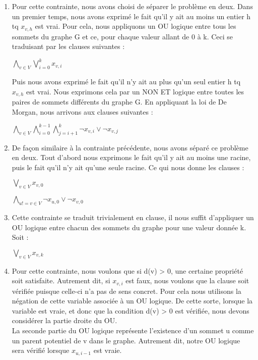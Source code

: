 \documentclass[a4paper]{article}
\begin{document}
\begin{enumerate}
\item
Pour cette contrainte, nous avons choisi de séparer le problème en deux.
Dans un premier temps, nous avons exprimé le fait qu'il y ait au moins un entier
h tq $x_{v, h}$ est vrai. Pour cela, nous appliquons un OU logique entre tous les
sommets du graphe G et ce, pour chaque valeur allant de 0 à k. Ceci se traduisant
par les clauses suivantes :
\begin{center}
$\bigwedge\limits_{v∈V}^{} \bigvee\limits_{i=0}^{k} x_{v,i}$
\end{center}

Puis nous avons exprimé le fait qu'il n'y ait au plus qu'un seul entier h tq
$x_{v, h}$ est vrai. Nous exprimons cela par un NON ET logique entre toutes les
paires de sommets différents du graphe G. En appliquant la loi de De Morgan, nous
arrivons aux clauses suivantes :
\begin{center}
$\bigwedge\limits_{v∈V}^{} \bigwedge\limits_{i=0}^{k-1} \bigwedge\limits_{j=i+1}^{k} \neg x_{v,i} \vee \neg x_{v,j} $
\end{center}

\item
De façon similaire à la contrainte précédente, nous avons séparé ce problème en
deux. Tout d'abord nous exprimons le fait qu'il y ait au moins une racine, puis
le fait qu'il n'y ait qu'une seule racine. Ce qui nous donne les clauses : \\
\begin{center}
$\bigvee\limits_{v∈V}^{} x_{v,0} $
\end{center}

\begin{center}
$\bigwedge\limits_{u!=v∈V}^{} \neg x_{u,0} \vee \neg x_{v,0}$
\end{center}

\item
Cette contrainte se traduit trivialement en clause, il nous suffit d'appliquer
un OU logique entre chacun des sommets du graphe pour une valeur donnée k.
Soit : \\
\begin{center}
$\bigvee\limits_{v∈V}^{} x_{v,k} $
\end{center}

\item
Pour cette contrainte, nous voulons que si d(v) > 0, une certaine propriété soit
satisfaite. Autrement dit, si $x_{v, i}$ est faux, nous voulons que la clause
soit vérifiée puisque celle-ci n'a pas de sens concret. Pour cela nous utilisons
la négation de cette variable associée à un OU logique. De cette sorte, lorsque
la variable est vraie, et donc que la condition d(v) > 0 est vérifiée, nous devons
considérer la partie droite du OU. \\
La seconde partie du OU logique représente l'existence d'un sommet u comme un
parent potentiel de v dans le graphe. Autrement dit, notre OU logique sera
vérifié lorsque $x_{u, i-1}$ est vraie.


\end{enumerate}
\end{document}
